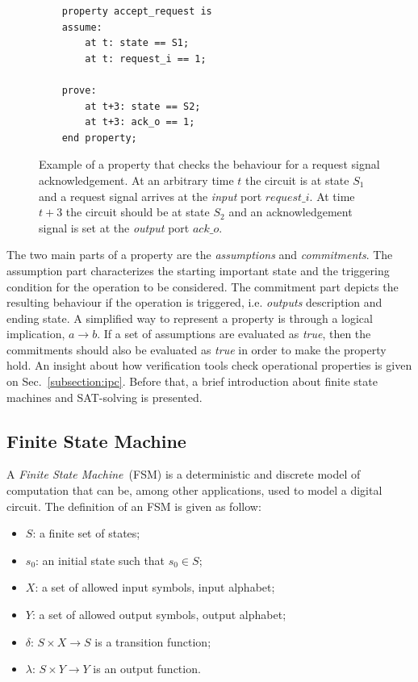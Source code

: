 \begin{figure}[htb!]
    \begin{lstlisting}
    property accept_request is
    assume:
        at t: state == S1;
        at t: request_i == 1;
    
    prove:
        at t+3: state == S2;
        at t+3: ack_o == 1;
    end property;\end{lstlisting}
    \caption{Example of a property that checks the behaviour for a request signal acknowledgement. At an arbitrary time $t$ the circuit is at state $S_1$ and a request signal arrives at the \textit{input} port $request\_i$. At time $t+3$ the circuit should be at state $S_2$ and an acknowledgement signal is set at the \textit{output} port $ack\_o$.}
    \label{fig:property}
\end{figure}

The two main parts of a property are the \textit{assumptions} and \textit{commitments}. The assumption part characterizes the starting important state and the triggering condition for the operation to be considered. The commitment part depicts the resulting behaviour if the operation is triggered, i.e. \textit{outputs} description and ending state. A simplified way to represent a property is through a logical implication, $a \longrightarrow b$. If a set of assumptions are evaluated as \textit{true}, then the commitments should also be evaluated as \textit{true} in order to make the property hold. An insight about how verification tools check operational properties is given on Sec.~\ref{subsection:ipc}. Before that, a brief introduction about finite state machines and SAT-solving is presented.

\subsection*{Finite State Machine}

A \textit{Finite State Machine}~(FSM) is a deterministic and discrete model of computation that can be, among other applications, used to model a digital circuit. The definition of an FSM is given as follow:

\begin{itemize}
    \item[] $S$: a finite set of states;
    \item[] $s_{0}$: an initial state such that $s_0 \in S$;
    \item[] $X$: a set of allowed input symbols, input alphabet;
    \item[] $Y$: a set of allowed output symbols, output alphabet;
    \item[] $\delta$: $S \times X \to S$ is a transition function;
    \item[] $\lambda$: $S \times Y \to Y$ is an output function.
\end{itemize}

